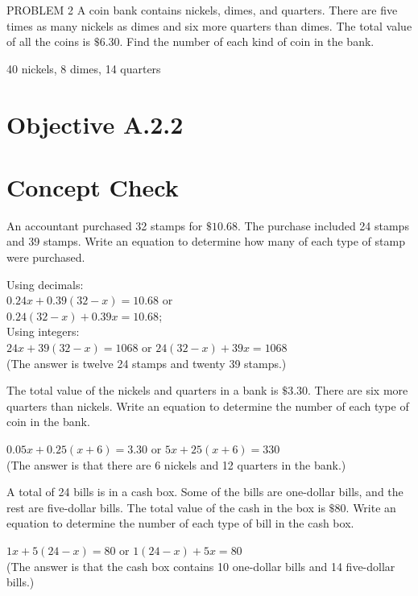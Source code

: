 \documentclass{ximera}
\begin{document}
\begin{problem}
PROBLEM 2 A coin bank contains nickels, dimes, and quarters. There are five times as many nickels as dimes and six more quarters than dimes. The total value of all the coins is $\$ 6.30$. Find the number of each kind of coin in the bank.
\begin{solution}
40 nickels, 8 dimes, 14 quarters
\end{solution}
\end{problem}

\section*{Objective A.2.2}
\section*{Concept Check}

\begin{question}
An accountant purchased 32 stamps for $\$ 10.68$. The purchase included 24\textcent{} stamps and 39\textcent{} stamps. Write an equation to determine how many of each type of stamp were purchased.
\begin{solution}
Using decimals:\\
$0.24 x+0.39(32-x)=10.68$ or\\
$0.24(32-x)+0.39 x=10.68$;\\
Using integers:\\
$24 x+39(32-x)=1068$ or $24(32-x)+39 x=1068$\\
(The answer is twelve 24\textcent{} stamps and twenty 39\textcent{} stamps.)
\end{solution}
\end{question}

\begin{question}
The total value of the nickels and quarters in a bank is $\$ 3.30$. There are six more quarters than nickels. Write an equation to determine the number of each type of coin in the bank.
\begin{solution}
$0.05 x+0.25(x+6)=3.30$ or $5 x+25(x+6)=330$\\
(The answer is that there are 6 nickels and 12 quarters in the bank.)
\end{solution}
\end{question}

\begin{question}
A total of 24 bills is in a cash box. Some of the bills are one-dollar bills, and the rest are five-dollar bills. The total value of the cash in the box is $\$ 80$. Write an equation to determine the number of each type of bill in the cash box.
\begin{solution}
$1 x+5(24-x)=80$ or $1(24-x)+5 x=80$\\
(The answer is that the cash box contains 10 one-dollar bills and 14 five-dollar bills.)
\end{solution}
\end{question}
\end{document}
